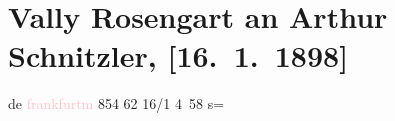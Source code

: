 

\renewcommand{\erwaehntePersonen}{Personen: Otto Brahm, Theodor Fontane, Paul Goldmann, Vally Rosengart, Paul Schlenther, Friedrich Stephany}
\renewcommand{\erwaehnteInstitutionen}{Institutionen: Burgtheater, Vossische Zeitung}
\renewcommand{\erwaehnteOrte}{Orte: Frankfurt am Main, Wien}
\renewcommand{\erwaehnteWerke}{}
\section[Vally Rosengart an Arthur Schnitzler, {[}16. 1. 1898{]}]{Vally Rosengart an Arthur Schnitzler, {[}16. 1. 1898{]}}
\nopagebreak{}
\rehead{ }\normalsize\beginnumbering{}
\toendnotes[C]{\smallbreak\pagebreak[2]}
\toendnotes[C]{\smallbreak}
\pstart
           \centering{}{\pb}de \textcolor{pink}{frankfurtm}{}\ledrightnote{\textcolor{pink}{Frankfurt am Main}}
                  854 62 16/1{ }4 58 s=\pend
           
